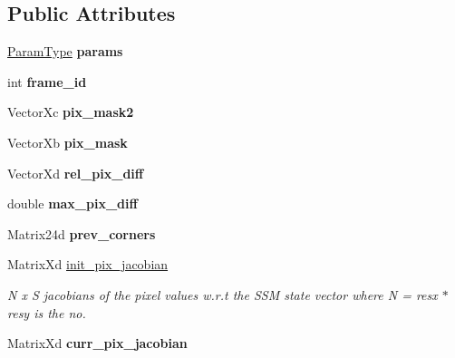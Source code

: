 \subsection*{Public Attributes}
\begin{DoxyCompactItemize}
\item 
\hypertarget{classESMH_a219054c57568def4e70a0648c24508ca}{\hyperlink{structESMHParams}{Param\-Type} {\bfseries params}}\label{classESMH_a219054c57568def4e70a0648c24508ca}

\item 
\hypertarget{classESMH_aeb4d26f04f7342c844e465b5be7e5bd2}{int {\bfseries frame\-\_\-id}}\label{classESMH_aeb4d26f04f7342c844e465b5be7e5bd2}

\item 
\hypertarget{classESMH_a12d17ae5a89de7017f728e11b02d703f}{Vector\-Xc {\bfseries pix\-\_\-mask2}}\label{classESMH_a12d17ae5a89de7017f728e11b02d703f}

\item 
\hypertarget{classESMH_aff7a27546fb557d1caee79cf8aeeab71}{Vector\-Xb {\bfseries pix\-\_\-mask}}\label{classESMH_aff7a27546fb557d1caee79cf8aeeab71}

\item 
\hypertarget{classESMH_a70f43fde224bfa1dd32558d6c8c42bb6}{Vector\-Xd {\bfseries rel\-\_\-pix\-\_\-diff}}\label{classESMH_a70f43fde224bfa1dd32558d6c8c42bb6}

\item 
\hypertarget{classESMH_aae20e3d5a7f1ad9b2548cd647092d076}{double {\bfseries max\-\_\-pix\-\_\-diff}}\label{classESMH_aae20e3d5a7f1ad9b2548cd647092d076}

\item 
\hypertarget{classESMH_ae3b0d2f6491dadc762d819b7fe824a31}{Matrix24d {\bfseries prev\-\_\-corners}}\label{classESMH_ae3b0d2f6491dadc762d819b7fe824a31}

\item 
Matrix\-Xd \hyperlink{classESMH_a705f1088f5a2a311463bfb9c59967941}{init\-\_\-pix\-\_\-jacobian}
\begin{DoxyCompactList}\small\item\em N x S jacobians of the pixel values w.\-r.\-t the S\-S\-M state vector where N = resx $\ast$ resy is the no. \end{DoxyCompactList}\item 
\hypertarget{classESMH_a08864655ce72855f5a692368e9f96bb6}{Matrix\-Xd {\bfseries curr\-\_\-pix\-\_\-jacobian}}\label{classESMH_a08864655ce72855f5a692368e9f96bb6}


\end{DoxyCompactItemize}
